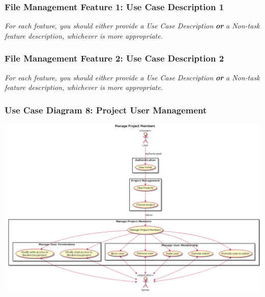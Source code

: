 \documentclass[twoside,letterpaper]{article}
\begin{document}
\newpage

\subsubsection[File Management Feature 1: Use Case Description 1]{\rmfamily\bfseries\color{black}
	File Management Feature 1: Use Case Description 1}
\hypertarget{RefHeading22059017292}{}
\bigskip

{\color{black}
	\foreignlanguage{english}{\textit{For each feature, you should either provide a Use Case Description
		}}\foreignlanguage{english}{\textbf{\textit{or}}}\foreignlanguage{english}{\textit{ a Non-task feature description,
		whichever is more appropriate.}}}
\newpage

\subsubsection[File Management Feature 2: Use Case Description 2]{\rmfamily\bfseries\color{black}
	File Management Feature 2: Use Case Description 2}
\hypertarget{RefHeading22059017292}{}
\bigskip

{\color{black}
	\foreignlanguage{english}{\textit{For each feature, you should either provide a Use Case Description
		}}\foreignlanguage{english}{\textbf{\textit{or}}}\foreignlanguage{english}{\textit{ a Non-task feature description,
		whichever is more appropriate.}}}
\newpage

\subsubsection[Use Case Diagram 8: Project User Management]{\rmfamily\bfseries\color{black}
	Use Case Diagram 8: Project User Management}

\includegraphics[width=\textwidth]{images/UseCases/ProjectUserManagement}
\end{document}
